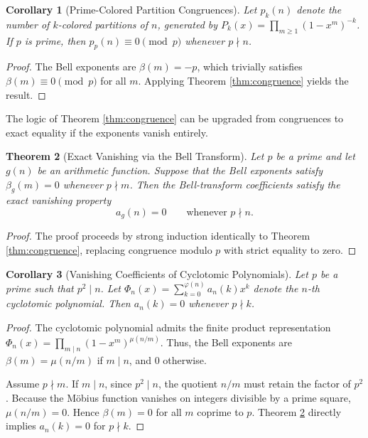 \documentclass[11pt, a4paper]{article}
\newtheorem{theorem}{Theorem}[section]
\newtheorem{corollary}[theorem]{Corollary}
\theoremstyle{remark}
\begin{document}
\begin{corollary}[Prime-Colored Partition Congruences]
Let \(p_k(n)\) denote the number of \(k\)-colored partitions of \(n\), generated by \(P_k(x) = \prod_{m\ge1}(1-x^m)^{-k}\). If \(p\) is prime, then \(p_p(n)\equiv0\pmod p\) whenever \(p\nmid n\).
\end{corollary}

\begin{proof}
The Bell exponents are \(\beta(m)=-p\), which trivially satisfies \(\beta(m)\equiv0\pmod p\) for all \(m\). Applying Theorem \ref{thm:congruence} yields the result.
\end{proof}

The logic of Theorem \ref{thm:congruence} can be upgraded from congruences to exact equality if the exponents vanish entirely.

\begin{theorem}[Exact Vanishing via the Bell Transform] \label{thm:vanishing}
Let \(p\) be a prime and let \(g(n)\) be an arithmetic function. Suppose that the Bell exponents satisfy \(\beta_g(m)=0\) whenever \(p\nmid m\). Then the Bell-transform coefficients satisfy the exact vanishing property
\[
\boxed{
a_g(n)=0
\qquad
\text{whenever }p\nmid n.
}
\]
\end{theorem}

\begin{proof}
The proof proceeds by strong induction identically to Theorem \ref{thm:congruence}, replacing congruence modulo \(p\) with strict equality to zero.
\end{proof}

\begin{corollary}[Vanishing Coefficients of Cyclotomic Polynomials]
Let \(p\) be a prime such that \(p^2\mid n\). Let \(\Phi_n(x) = \sum_{k=0}^{\varphi(n)} a_n(k)x^k\) denote the \(n\)-th cyclotomic polynomial. Then \(a_n(k)=0\) whenever \(p\nmid k\).
\end{corollary}

\begin{proof}
The cyclotomic polynomial admits the finite product representation \(\Phi_n(x) = \prod_{m\mid n} (1-x^m)^{\mu(n/m)}\). Thus, the Bell exponents are \(\beta(m) = \mu(n/m)\) if \(m\mid n\), and \(0\) otherwise. 

Assume \(p\nmid m\). If \(m\mid n\), since \(p^2\mid n\), the quotient \(n/m\) must retain the factor of \(p^2\). Because the Möbius function vanishes on integers divisible by a prime square, \(\mu(n/m)=0\). Hence \(\beta(m)=0\) for all \(m\) coprime to \(p\). Theorem \ref{thm:vanishing} directly implies \(a_n(k)=0\) for \(p\nmid k\).
\end{proof}
\end{document}
